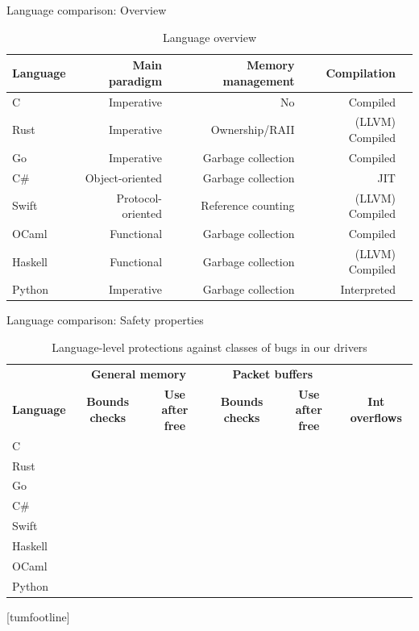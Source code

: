 \documentclass[NET,english,aspectratio=169,notitleframe]{tumbeamer}
\newcommand{\xmark}{\textcolor{TUMDarkRed}{\ding{55}}}%
\begin{document}
\begin{frame}{Language comparison: Overview}
\begin{table}[t]
 \setlength{\tabcolsep}{2mm}
	\centering
	\footnotesize
	\begin{tabular}{lrrrr}
		\textbf{Language} & \textbf{Main paradigm} & \textbf{Memory management} & \textbf{Compilation} \\
		\toprule
		C & Imperative & No & Compiled \\
		Rust & Imperative & Ownership/RAII & (LLVM) Compiled \\
		Go & Imperative & Garbage collection & Compiled \\
		C\# & Object-oriented & Garbage collection & JIT \\
		Swift & Protocol-oriented & Reference counting & (LLVM) Compiled \\
		OCaml & Functional & Garbage collection & Compiled \\
		Haskell & Functional & Garbage collection & (LLVM) Compiled \\
		Python & Imperative & Garbage collection & Interpreted \\
		\bottomrule
	\end{tabular}
	\caption{Language overview}
	\label{tbl:languages}
\end{table}
\end{frame}

\begin{frame}{Language comparison: Safety properties}
\begin{table}[t]
 \setlength{\tabcolsep}{1.3mm}
	\centering
	\footnotesize
	\begin{tabular}{lccccc}
		& \multicolumn{2}{c}{\textbf{General memory}} & \multicolumn{2}{c}{\hspace{-1em}\textbf{Packet buffers}}  \\
		\textbf{Language} & \textbf{Bounds checks} & \textbf{Use after free}  & \textbf{Bounds checks} & \textbf{Use after free} & \textbf{Int overflows} \\
		\toprule
		C & \xmark & \xmark & \xmark & \xmark & \xmark \\
		Rust & &  &  &  &  \\
		Go  & &  &  &  &  \\
		C\#  & &  &  &  &  \\
		Swift  & &  &  &  &  \\
		Haskell  & &  &  &  &  \\
		OCaml  & &  &  &  &  \\
		Python  & &  &  &  &  \\
		\bottomrule
	\end{tabular}
	\caption{Language-level protections against classes of bugs in our drivers}
	\label{tbl:lang-safety}
	\vspace{-3em}
\end{table}
\end{frame}
[tumfootline]
\end{document}
